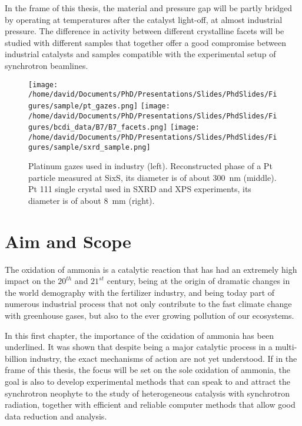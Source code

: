 In the frame of this thesis, the material and pressure gap will be partly bridged by operating at temperatures after the catalyst light-off, at almost industrial pressure.
The difference in activity between different crystalline facets will be studied with different samples that together offer a good compromise between industrial catalysts and samples compatible with the experimental setup of synchrotron beamlines.

\begin{figure}[!htb]
    \centering
    \texttt{[image: /home/david/Documents/PhD/Presentations/Slides/PhdSlides/Figures/sample/pt\_gazes.png]}
    \texttt{[image: /home/david/Documents/PhD/Presentations/Slides/PhdSlides/Figures/bcdi\_data/B7/B7\_facets.png]}
    \texttt{[image: /home/david/Documents/PhD/Presentations/Slides/PhdSlides/Figures/sample/sxrd\_sample.png]}
    \caption{
    Platinum gazes used in industry (left).
    Reconstructed phase of a Pt particle measured at SixS, its diameter is of about \qty{300}{\nm} (middle).
    Pt 111 single crystal used in SXRD and XPS experiments, its diameter is of about \qty{8}{\mm} (right).
    }
\end{figure}

\section{Aim and Scope}

The oxidation of ammonia is a catalytic reaction that has had an extremely high impact on the $20^{th}$ and $21^{st}$ century, being at the origin of dramatic changes in the world demography with the fertilizer industry, and being today part of numerous industrial process that not only contribute to the fast climate change with greenhouse gases, but also to the ever growing pollution of our ecosystems.

In this first chapter, the importance of the oxidation of ammonia has been underlined.
It was shown that despite being a major catalytic process in a multi-billion industry, the exact mechanisms of action are not yet understood.
If in the frame of this thesis, the focus will be set on the sole oxidation of ammonia, the goal is also to develop experimental methods that can speak to and attract the synchrotron neophyte to the study of heterogeneous catalysis with synchrotron radiation, together with efficient and reliable computer methods that allow good data reduction and analysis.

